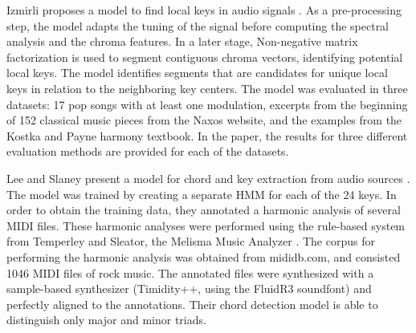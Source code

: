 
Izmirli proposes a model to find local keys in audio signals
\parencite{izmirli2007localized}. As a pre-processing step,
the model adapts the tuning of the signal before computing
the spectral analysis and the chroma features. In a later
stage, Non-negative matrix factorization is used to segment
contiguous chroma vectors, identifying potential local keys.
The model identifies segments that are candidates for unique
local keys in relation to the neighboring key centers. The
model was evaluated in three datasets: 17 pop songs with at
least one modulation, excerpts from the beginning of 152
classical music pieces from the Naxos website, and the
examples from the Kostka and Payne harmony textbook. In the
paper, the results for three different evaluation methods
are provided for each of the datasets.

Lee and Slaney present a model for chord and key extraction
from audio sources \parencite{lee2007unified}. The model was
trained by creating a separate HMM for each of the 24 keys.
In order to obtain the training data, they annotated a
harmonic analysis of several MIDI files. These harmonic
analyses were performed using the rule-based system from
Temperley and Sleator, the Melisma Music Analyzer
\parencite{temperley2004cognition}. The corpus for
performing the harmonic analysis was obtained from
mididb.com, and consisted 1046 MIDI files of rock music. The
annotated files were synthesized with a sample-based
synthesizer (Timidity++, using the FluidR3 soundfont) and
perfectly aligned to the annotations. Their chord detection
model is able to distinguish only major and minor triads.




